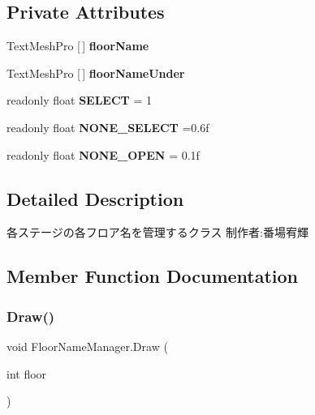 \subsection*{Private Attributes}
\begin{DoxyCompactItemize}
\item 
\mbox{\label{class_floor_name_manager_a13316c181a604b9a2392179e1c059af3}} 
Text\+Mesh\+Pro \mbox{[}$\,$\mbox{]} {\bfseries floor\+Name}
\item 
\mbox{\label{class_floor_name_manager_a34a6ab655075b3111b0f42cb224b48e8}} 
Text\+Mesh\+Pro \mbox{[}$\,$\mbox{]} {\bfseries floor\+Name\+Under}
\item 
\mbox{\label{class_floor_name_manager_a382ca0d3c313111bbb97d753480328ef}} 
readonly float {\bfseries S\+E\+L\+E\+CT} = 1
\item 
\mbox{\label{class_floor_name_manager_a6b8a0ebe7f6cae9c9a28f1580eb4b22a}} 
readonly float {\bfseries N\+O\+N\+E\+\_\+\+S\+E\+L\+E\+CT} =0.\+6f
\item 
\mbox{\label{class_floor_name_manager_a57d3bd49bb166cda4c883a840377724b}} 
readonly float {\bfseries N\+O\+N\+E\+\_\+\+O\+P\+EN} = 0.\+1f
\end{DoxyCompactItemize}


\subsection{Detailed Description}
各ステージの各フロア名を管理するクラス 制作者\+:番場宥輝 



\subsection{Member Function Documentation}
\mbox{\label{class_floor_name_manager_a226c28a82232989bc58ddc4d60f11fbb}} 
\subsubsection{\texorpdfstring{Draw()}{Draw()}}
{\footnotesize\ttfamily void Floor\+Name\+Manager.\+Draw (\begin{DoxyParamCaption}\item[{int}]{floor }\end{DoxyParamCaption})\hspace{0.3cm}{\ttfamily [inline]}}



